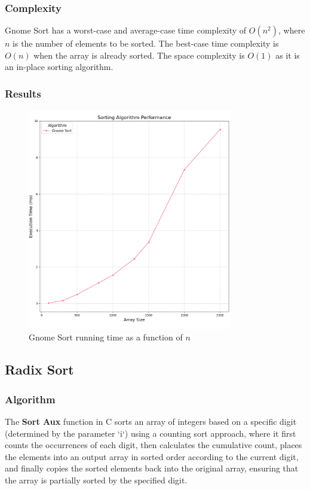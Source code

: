 \documentclass{article}
\begin{document}
\subsubsection{Complexity}
Gnome Sort has a worst-case and average-case time complexity of $O(n^2)$, where $n$ is the number of elements to be sorted. The best-case time complexity is $O(n)$ when the array is already sorted. The space complexity is $O(1)$ as it is an in-place sorting algorithm.

\subsubsection{Results}
\begin{figure}[H]
	\includegraphics[width=0.8\textwidth]{images/gnome_sort.png}
	\caption{Gnome Sort running time as a function of $n$}
\end{figure}


\subsection{Radix Sort}

\subsubsection{Algorithm}
The \textbf{Sort Aux} function in C sorts an array of integers based on a specific digit (determined by the parameter `i`) using a counting sort approach, where it first counts the occurrences of each digit, then calculates the cumulative count, places the elements into an output array in sorted order according to the current digit, and finally copies the sorted elements back into the original array, ensuring that the array is partially sorted by the specified digit.
\end{document}
